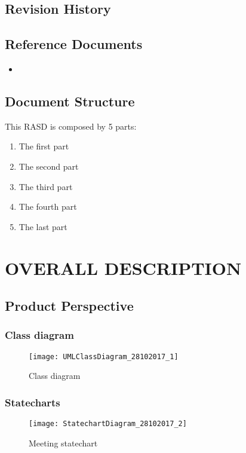 \documentclass[a4paper,leqno]{book}
\begin{document}
\section{Revision History}

\section{Reference Documents}
\begin{itemize}
	\item 
\end{itemize}

\section{Document Structure}
This RASD is composed by 5 parts:
\begin{enumerate}
	\item The first part
	\item The second part
	\item The third part
	\item  The fourth part
	\item  The last part
\end{enumerate}

\chapter{OVERALL DESCRIPTION}
\section{Product Perspective}

\subsection{Class diagram}
\begin{figure}[!h]
	\begin{center}
		\texttt{[image: UMLClassDiagram\_28102017\_1]}
	\end{center}
	\caption{Class diagram}
\end{figure}

\newpage
\subsection{Statecharts}
\begin{figure}[!h]
	\begin{centering}
		\texttt{[image: StatechartDiagram\_28102017\_2]}
		\end{centering}
	\caption{Meeting statechart}
\end{figure}
\end{document}
